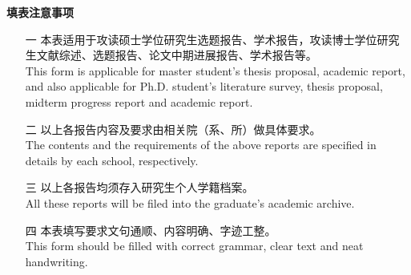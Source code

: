 \begin{titlepage}
    \begin{CJK*}{UTF8}{gkai}
\centering    
    
    {\fontsize{30}{60}
    \textbf{填表注意事项}} \\
    
\vspace{2cm}

\fontsize{20}{1.5pt}

\begin{itemize}

    \setlength\itemsep{20pt}
    
    \item[一]	本表适用于攻读硕士学位研究生选题报告、学术报告，攻读博士学位研究生文献综述、选题报告、论文中期进展报告、学术报告等。 \\
    This form is applicable for master student’s thesis proposal, academic report, and also applicable for Ph.D. student’s literature survey, thesis proposal, midterm progress report and academic report.

    \item[二]	以上各报告内容及要求由相关院（系、所）做具体要求。 \\
    The contents and the requirements of the above reports are specified in details by each school, respectively.

    \item[三]	以上各报告均须存入研究生个人学籍档案。 \\
    All these reports will be filed into the graduate’s academic archive.
    
    \item[四]   本表填写要求文句通顺、内容明确、字迹工整。 \\
    This form should be filled with correct grammar, clear text and neat handwriting.

\end{itemize}


\end{CJK*} 
\end{titlepage}